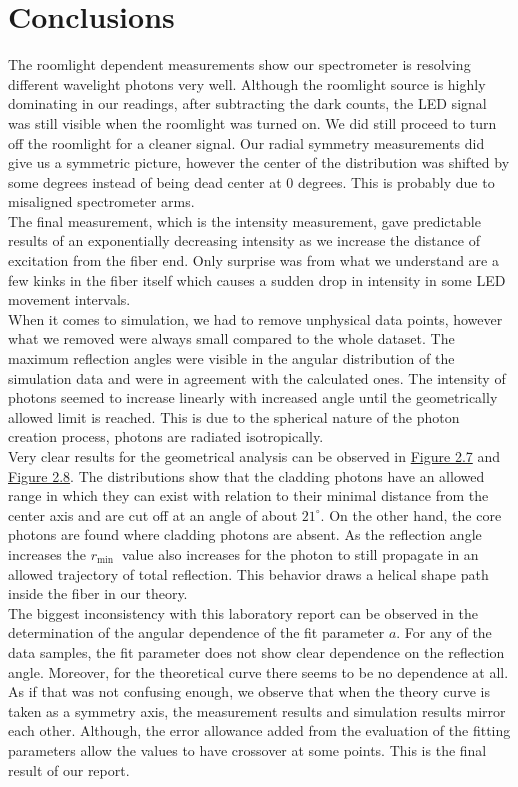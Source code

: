 \chapter*{Conclusions}\label{chap:conclusion}

The roomlight dependent measurements show our spectrometer is resolving different wavelight photons very well. Although the roomlight source is highly dominating in our readings, after subtracting the dark counts, the LED signal was still visible when the roomlight was turned on. We did still proceed to turn off the roomlight for a cleaner signal. Our radial symmetry measurements did give us a symmetric picture, however the center of the distribution was shifted by some degrees instead of being dead center at 0 degrees. This is probably due to misaligned spectrometer arms.\\

The final measurement, which is the intensity measurement, gave predictable results of an exponentially decreasing intensity as we increase the distance of excitation from the fiber end. Only surprise was from what we understand are a few kinks in the fiber itself which causes a sudden drop in intensity in some LED movement intervals.\\

When it comes to simulation, we had to remove unphysical data points, however what we removed were always small compared to the whole dataset. The maximum reflection angles were visible in the angular distribution of the simulation data and were in agreement with the calculated ones. The intensity of photons seemed to increase linearly with increased angle until the geometrically allowed limit is reached. This is due to the spherical nature of the photon creation process, photons are radiated isotropically.\\

Very clear results for the geometrical analysis can be observed in \hyperref[corerefl]{Figure 2.7} and \hyperref[cladrefl]{Figure 2.8}. The distributions show that the cladding photons have an allowed range in which they can exist with relation to their minimal distance from the center axis and are cut off at an angle of about $21^{\circ}$. On the other hand, the core photons are found where cladding photons are absent. As the reflection angle increases the $r_{\text {min }}$ value also increases for the photon to still propagate in an allowed trajectory of total reflection. This behavior draws a helical shape path inside the fiber in our theory.\\

The biggest inconsistency with this laboratory report can be observed in the determination of the angular dependence of the fit parameter $a$. For any of the data samples, the fit parameter does not show clear dependence on the reflection angle. Moreover, for the theoretical curve there seems to be no dependence at all. As if that was not confusing enough, we observe that when the theory curve is taken as a symmetry axis, the measurement results and simulation results mirror each other. Although, the error allowance added from the evaluation of the fitting parameters allow the values to have crossover at some points. This is the final result of our report.